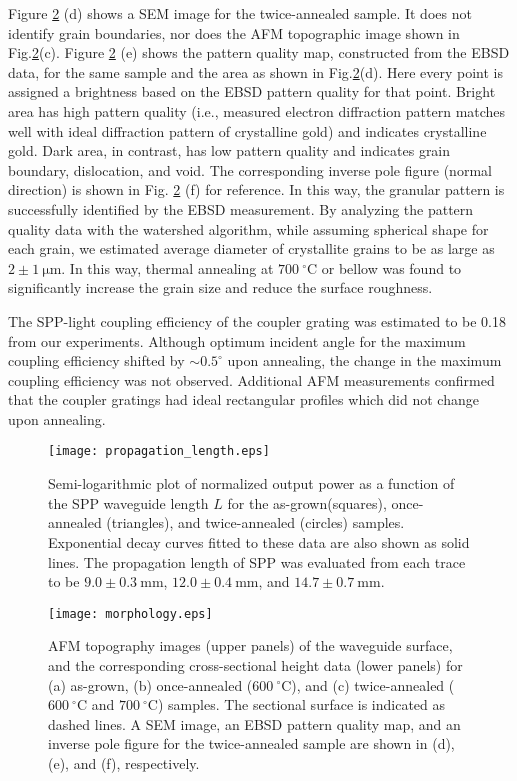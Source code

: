\documentclass[aip,apl,reprint]{revtex4-1}
\begin{document}
Figure \ref{fig:morphology} (d) shows a SEM image for the twice-annealed sample. It does not identify grain boundaries, nor does the AFM topographic image shown in Fig.\ref{fig:morphology}(c).
Figure \ref{fig:morphology} (e) shows the pattern quality map, constructed from the EBSD data, for the same sample and the area as shown in Fig.\ref{fig:morphology}(d). Here every point is assigned a brightness based on the EBSD pattern quality for that point. Bright area has high pattern quality (i.e., measured electron diffraction pattern matches well with ideal diffraction pattern of crystalline gold) and indicates crystalline gold. Dark area, in contrast, has low pattern quality and indicates grain boundary, dislocation, and void. The corresponding inverse pole figure (normal direction) is shown in Fig. \ref{fig:morphology} (f) for reference. In this way, the granular pattern is successfully identified by the EBSD measurement. By analyzing the pattern quality data with the watershed algorithm\cite{Petr}, while assuming spherical shape for each grain, we estimated average diameter of crystallite grains to be as large as $2\pm1\:\mathrm{\mu m}$. In this way, thermal annealing at $700\:^\circ\mathrm{C}$ or bellow was found to significantly increase the grain size and reduce the surface roughness.

The SPP-light coupling efficiency of the coupler grating was estimated to be 0.18 from our experiments. Although optimum incident angle for the maximum coupling efficiency shifted by $\sim0.5^\circ$ upon annealing, the change in the maximum coupling efficiency was not observed. Additional AFM measurements confirmed that the coupler gratings had ideal rectangular profiles which did not change upon annealing. 

 \begin{figure}
    \texttt{[image: propagation\_length.eps]}
    \caption{Semi-logarithmic plot of normalized output power as a function of the SPP waveguide length $L$ for the as-grown(squares), once-annealed (triangles), and twice-annealed (circles) samples. Exponential decay curves fitted to these data are also shown as solid lines. The propagation length of SPP was evaluated from each trace to be $9.0\pm0.3\:\mathrm{mm}$, $12.0\pm0.4\:\mathrm{mm}$, and $14.7\pm0.7\:\mathrm{mm}$.}
       \label{fig:propagation_length}
\end{figure}

  \begin{figure}
    \texttt{[image: morphology.eps]}
        \caption{AFM topography images (upper panels) of the waveguide surface, and the corresponding cross-sectional height data (lower panels) for (a) as-grown, (b) once-annealed ($600\:^\circ\mathrm{C}$), and (c) twice-annealed ($600\:^\circ\mathrm{C}$ and $700\:^\circ\mathrm{C}$) samples. The sectional surface is indicated as dashed lines. A SEM image, an EBSD pattern quality map, and an inverse pole figure for the twice-annealed sample are shown in (d), (e), and (f), respectively.}
    \label{fig:morphology}
\end{figure}
\end{document}
